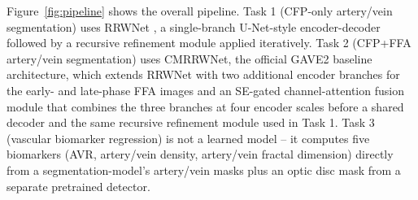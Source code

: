 \documentclass[runningheads]{llncs}
\begin{document}
Figure~\ref{fig:pipeline} shows the overall pipeline. Task 1 (CFP-only
artery/vein segmentation) uses RRWNet \cite{morano2024rrwnet}, a single-branch
U-Net-style encoder-decoder followed by a recursive refinement module applied
iteratively. Task 2 (CFP+FFA artery/vein segmentation) uses CMRRWNet, the
official GAVE2 baseline architecture, which extends RRWNet with two
additional encoder branches for the early- and late-phase FFA images and an
SE-gated channel-attention fusion module that combines the three branches at
four encoder scales before a shared decoder and the same recursive refinement
module used in Task 1. Task 3 (vascular biomarker regression) is not a
learned model -- it computes five biomarkers (AVR, artery/vein density,
artery/vein fractal dimension) directly from a segmentation-model's
artery/vein masks plus an optic disc mask from a separate pretrained
detector.
\end{document}

